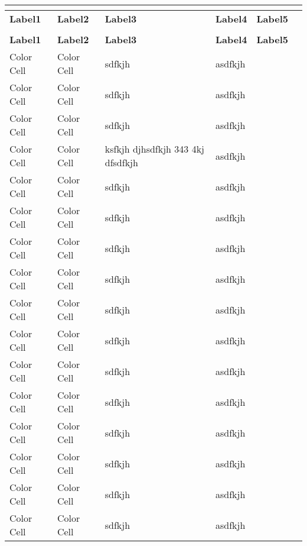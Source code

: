\documentclass{article}
\begin{document}
\newpage
\renewcommand{\baselinestretch}{1.05}
\begin{center}
\LARGE
\keepXColumns
{}%
\begin{tabularx}{\textwidth}
{| Y@{} | s@{} | Y@{} | Y@{} | Y@{} | Y@{} |}
\\
\hline
\textbf{Label1} &\textbf{Label2} &\textbf{Label3} &\textbf{Label4} &\textbf{Label5}\\
\hline
\endfirsthead%
\\
\hline
\textbf{Label1} &\textbf{Label2} &\textbf{Label3} &\textbf{Label4} &\textbf{Label5}\\
\hline
\endhead%
Color Cell & Color Cell &sdfkjh  & asdfkjh & \\
\hline
Color Cell & Color Cell &sdfkjh  & asdfkjh & \\
\hline
Color Cell & Color Cell &sdfkjh  & asdfkjh & \\
\hline
Color Cell & Color Cell & ksfkjh djhsdfkjh 343 4kj dfsdfkjh  & asdfkjh & \\
\hline
Color Cell & Color Cell &sdfkjh  & asdfkjh & \\
\hline
Color Cell & Color Cell &sdfkjh  & asdfkjh & \\
\hline
Color Cell & Color Cell &sdfkjh  & asdfkjh & \\
\hline
Color Cell & Color Cell &sdfkjh  & asdfkjh & \\
\hline
Color Cell & Color Cell &sdfkjh  & asdfkjh & \\
\hline
Color Cell & Color Cell &sdfkjh  & asdfkjh & \\
\hline
Color Cell & Color Cell &sdfkjh  & asdfkjh & \\
\hline
Color Cell & Color Cell &sdfkjh  & asdfkjh & \\
\hline
Color Cell & Color Cell &sdfkjh  & asdfkjh & \\
\hline
Color Cell & Color Cell &sdfkjh  & asdfkjh & \\
\hline
Color Cell & Color Cell &sdfkjh  & asdfkjh & \\
\hline
Color Cell & Color Cell &sdfkjh  & asdfkjh & \\

\end{tabularx}
\end{center}
\end{document}
